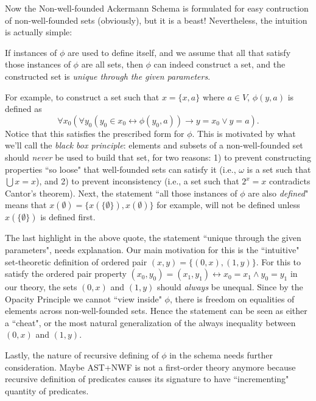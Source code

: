 \documentclass{article}
\begin{document}
Now the Non-well-founded Ackermann Schema is formulated for easy contruction of non-well-founded sets (obviously), but it is a beast! Nevertheless, the intuition is actually simple:

\begin{displayquote}
If instances of $\phi$ are used to define itself, and we assume that all that satisfy those instances of $\phi$ are all sets, then $\phi$ can indeed construct a set, and the constructed set is \textit{unique through the given parameters}.
\end{displayquote}

For example, to construct a set such that $x=\{x, a\}$ where $a \in V$, $\phi(y, a)$ is defined as $$\forall x_0 (\forall y_0 (y_0 \in x_0 \leftrightarrow \phi(y_0, a)) \rightarrow y = x_0 \vee y = a).$$ Notice that this satisfies the prescribed form for $\phi$. This is motivated by what we'll call the \textit{black box principle}: elements and subsets of a non-well-founded set should \textit{never} be used to build that set, for two reasons: 1) to prevent constructing properties ``so loose" that well-founded sets can satisfy it (i.e., $\omega$ is a set such that $\bigcup x = x$), and 2) to prevent inconsistency (i.e., a set such that $2^x = x$ contradicts Cantor's theorem). Next, the statement ``all those instances of $\phi$ are also \textit{defined}" means that $x(\emptyset) = \{x(\{\emptyset\}), x(\emptyset)\}$ for example, will not be defined unless $x(\{\emptyset\})$ is defined first.

The last highlight in the above quote, the statement ``unique through the given parameters", needs explanation. Our main motivation for this is the ``intuitive" set-theoretic definition of ordered pair $(x,y) = \{(0,x), (1, y)\}$. For this to satisfy the ordered pair property $(x_0,y_0) = (x_1, y_1) \leftrightarrow x_0 = x_1 \wedge y_0 = y_1$ in our theory, the sets $(0,x)$ and $(1,y)$ should \textit{always} be unequal. Since by the Opacity Principle we cannot ``view inside" $\phi$, there is freedom on equalities of elements across non-well-founded sets. Hence the statement can be seen as either a ``cheat", or the most natural generalization of the always inequality between $(0,x)$ and $(1,y)$.

Lastly, the nature of recursive defining of $\phi$ in the schema needs further consideration. Maybe \textsf{AST+NWF} is not a first-order theory anymore because recursive definition of predicates causes its signature to have ``incrementing" quantity of predicates.
\end{document}
